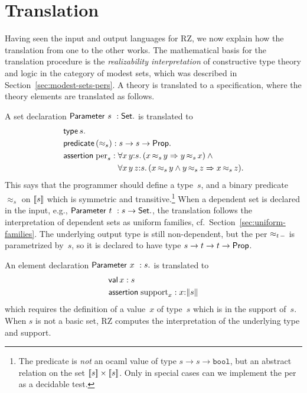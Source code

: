 \section{Translation}
\label{sec:translation}

Having seen the input and output languages for RZ, we now explain how
the translation from one to the other works. The mathematical basis
for the translation procedure is the \emph{realizability
  interpretation} of constructive type theory and logic in the
category of modest sets, which was described in
Section~\ref{sec:modest-sets-pers}. A theory is translated to a
specification, where the theory elements are translated as follows.

A set declaration $\mathsf{Parameter}\ s\ : \mathsf{Set}.$ is translated to
%
\begin{align*}
  & \otyspec{s}. \\
  & \opropspec{({\approx_{s}})}{\oarrow{s}{\oarrow{s}{\oProp}}}.\\
  & \oassertion{\mathrm{per}_{s}}{
    \begin{aligned}[t]
      & \oforall{x\,y}{s}{(\oimply{\oper{s}{x}{y}}{\oper{s}{y}{x}})}
        \land {} \\
      & \oforall{x\,y\,z}{s}{(
        \oimply{
          \oper{s}{x}{y} \land \oper{s}{y}{z}
          }{\oper{s}{x}{z}}
        )}.
    \end{aligned}
  }
\end{align*}
%
This says that the programmer should define a type~$s$, and a binary
predicate~$\approx_s$ on $[\![s]\!]$ which is symmetric and
transitive.\footnote{The predicate is \emph{not} an ocaml value of
  type $s \to s \to \mathtt{bool}$, but an abstract relation on the
  set $[\![s]\!] \times [\![s]\!]$. Only in special cases can we
  implement the per as a decidable test.} When a dependent set is
declared in the input, e.g., $\mathsf{Parameter}\ t\ : s \to \mathsf{Set}.$, the
translation follows the interpretation of dependent sets as uniform
families, cf.\ Section~\ref{sec:uniform-families}. The underlying
output type is still non-dependent, but the per
$\approx_{t\,{-}}$ is parametrized by~$s$, so it is declared to
have type $s \to t \to t \to \mathsf{Prop}$.

An element declaration $\mathsf{Parameter}\ x\ : s.$ is translated to
%
\begin{align*}
  & \mathsf{val}\,x:s \\
  & \mathsf{assertion}\; \mathrm{support}_x : x{:}\|s\|
\end{align*}
%
which requires the definition of a value~$x$ of type~$s$ which is in
the support of~$s$. When $s$ is not a basic set, RZ computes the
interpretation of the underlying type and support.

